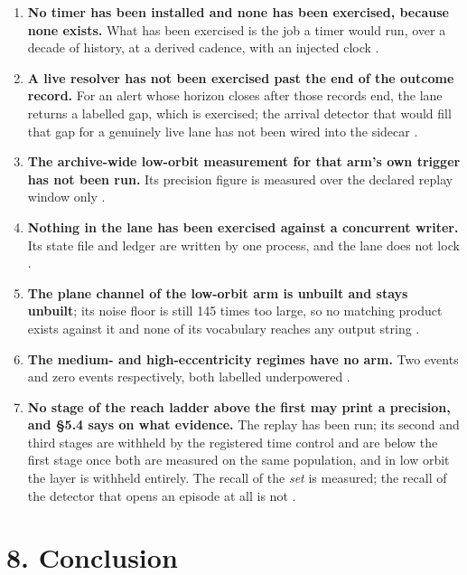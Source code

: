 \documentclass[11pt]{article}
\begin{document}
\begin{enumerate}
\item[1.] \textbf{No timer has been installed and none has been exercised, because none exists.} What has been exercised is the job a timer would run, over a decade of history, at a derived cadence, with an injected clock%
.
\item[2.] \textbf{A live resolver has not been exercised past the end of the outcome record.} For an alert whose horizon closes after those records end, the lane returns a labelled gap, which is exercised; the arrival detector that would fill that gap for a genuinely live lane has not been wired into the sidecar%
.
\item[3.] \textbf{The archive-wide low-orbit measurement for that arm's own trigger has not been run.} Its precision figure is measured over the declared replay window only%
.
\item[4.] \textbf{Nothing in the lane has been exercised against a concurrent writer.} Its state file and ledger are written by one process, and the lane does not lock%
.
\item[5.] \textbf{The plane channel of the low-orbit arm is unbuilt and stays unbuilt}; its noise floor is still 145 times too large, so no matching product exists against it and none of its vocabulary reaches any output string%
.
\item[6.] \textbf{The medium- and high-eccentricity regimes have no arm.} Two events and zero events respectively, both labelled underpowered%
.
\item[7.] \textbf{No stage of the reach ladder above the first may print a precision, and \S{}5.4 says on what evidence.} The replay has been run; its second and third stages are withheld by the registered time control and are below the first stage once both are measured on the same population, and in low orbit the layer is withheld entirely. The recall of the \emph{set} is measured; the recall of the detector that opens an episode at all is not%
.
\end{enumerate}

\section*{8. Conclusion}
\end{document}

